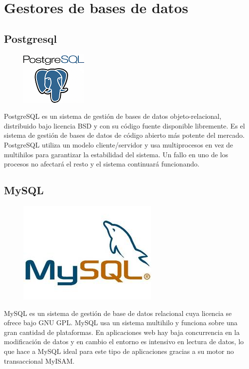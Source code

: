 \documentclass[12pt, oneside]{article}
\begin{document}
\section{Gestores de bases de datos}

\subsection{Postgresql}

\begin{figure}
	\includegraphics[scale=.8]{img/postgresql-logo.png}
\end{figure}

PostgreSQL es un sistema de gestión de bases de datos objeto-relacional, distribuido bajo licencia BSD y con su código fuente disponible libremente. Es el sistema de gestión de bases de datos de código abierto más potente del mercado.
PostgreSQL utiliza un modelo cliente/servidor y usa multiprocesos en vez de multihilos para garantizar la estabilidad del sistema. Un fallo en uno de los procesos no afectará el resto y el sistema continuará funcionando.

\subsection{MySQL}

\begin{figure}
	\includegraphics[scale=.3]{img/mysql-logo.jpg}
\end{figure}

MySQL es un sistema de gestión de base de datos relacional cuya licencia se ofrece bajo GNU GPL.
MySQL usa un sistema multihilo y funciona sobre una gran cantidad de plataformas.
En aplicaciones web hay baja concurrencia en la modificación de datos y en cambio el entorno es intensivo en lectura de datos, lo que hace a MySQL ideal para este tipo de aplicaciones gracias a su motor no transaccional MyISAM.
\end{document}
